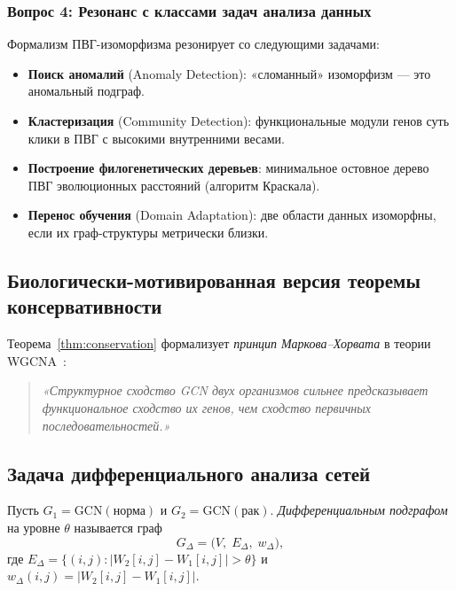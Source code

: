 \subsubsection{Вопрос 4: Резонанс с классами задач анализа данных}

Формализм ПВГ-изоморфизма резонирует со следующими задачами:
\begin{itemize}
    \item \textbf{Поиск аномалий} (Anomaly Detection):
          «сломанный» изоморфизм — это аномальный подграф.
    \item \textbf{Кластеризация} (Community Detection):
          функциональные модули генов суть клики в ПВГ с высокими внутренними весами.
    \item \textbf{Построение филогенетических деревьев}:
          минимальное остовное дерево ПВГ эволюционных расстояний (алгоритм Краскала).
    \item \textbf{Перенос обучения} (Domain Adaptation):
          две области данных изоморфны, если их граф-структуры метрически близки.
\end{itemize}

\subsection{Биологически-мотивированная версия теоремы консервативности}

Теорема~\ref{thm:conservation} формализует \emph{принцип Маркова–Хорвата}
в теории WGCNA~\cite{wgcna2008}:
\begin{quote}
\itshape
«Структурное сходство GCN двух организмов сильнее предсказывает функциональное
сходство их генов, чем сходство первичных последовательностей.»
\end{quote}

\subsection{Задача дифференциального анализа сетей}

\begin{definition}
Пусть $G_1 = \mathrm{GCN}(\text{норма})$ и $G_2 = \mathrm{GCN}(\text{рак})$.
\emph{Дифференциальным подграфом} на уровне $\theta$ называется граф
\[
    G_{\Delta} = \bigl(V,\; E_{\Delta},\; w_\Delta\bigr),
\]
где $E_{\Delta} = \{(i,j) : |W_2[i,j] - W_1[i,j]| > \theta\}$
и $w_\Delta(i,j) = |W_2[i,j] - W_1[i,j]|$.
\end{definition}

